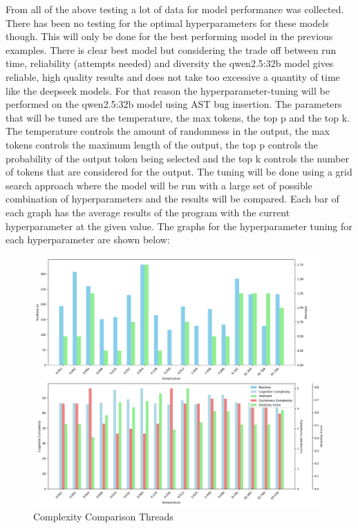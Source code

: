 \documentclass[12pt]{extarticle}
\begin{document}
From all of the above testing a lot of data for model performance was collected. There has been no testing for the optimal hyperparameters for these models though. This will only be done for the best performing model in the previous examples. There is clear best model but considering the trade off between run time, reliability (attempts needed) and diversity the qwen2.5:32b model gives reliable, high quality results and does not take too excessive a quantity of time like the deepseek models. For that reason the hyperparameter-tuning will be performed on the qwen2.5:32b model using AST bug insertion. The parameters that will be tuned are the temperature, the max tokens, the top p and the top k. The temperature controls the amount of randomness in the output, the max tokens controls the maximum length of the output, the top p controls the probability of the output token being selected and the top k controls the number of tokens that are considered for the output. The tuning will be done using a grid search approach where the model will be run with a large set of possible combination of hyperparameters and the results will be compared. Each bar of each graph has the average results of the program with the current hyperparameter at the given value. The graphs for the hyperparameter tuning for each hyperparameter are shown below:

\begin{figure}[h!]
\centering
\includegraphics[width=0.8\linewidth]{Images/Hyperparam_temperature_Comparison.png}
\caption{Complexity Comparison Threads}
\label{fig:Complexity_Comparison_Threads}
\end{figure}
\end{document}
